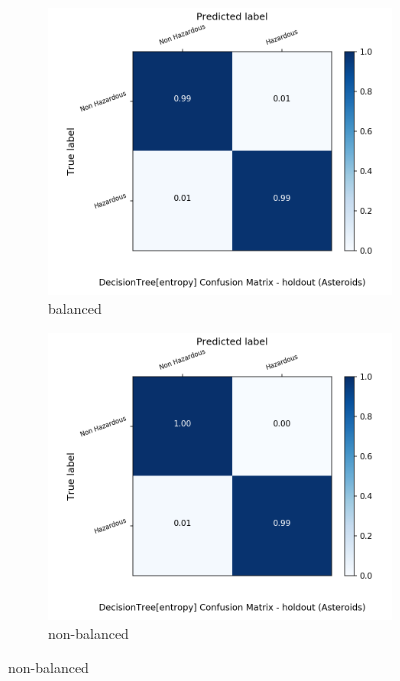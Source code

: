 \begin{figure}[H]
	\centering
	\begin{subfigure}{.5\textwidth}
		\centering
		\includegraphics[width=1.1\textwidth]{Plots/asteroids/asteroids_DecisionTree_entropy_balance_True_holdout.png}
		\caption{balanced}
	\end{subfigure}%
	\begin{subfigure}{.5\textwidth}
		\centering
		\includegraphics[width=1.1\textwidth]{Plots/asteroids/asteroids_DecisionTree_entropy_balance_False_holdout.png}
		\caption{non-balanced}
	\end{subfigure}
\end{figure}

